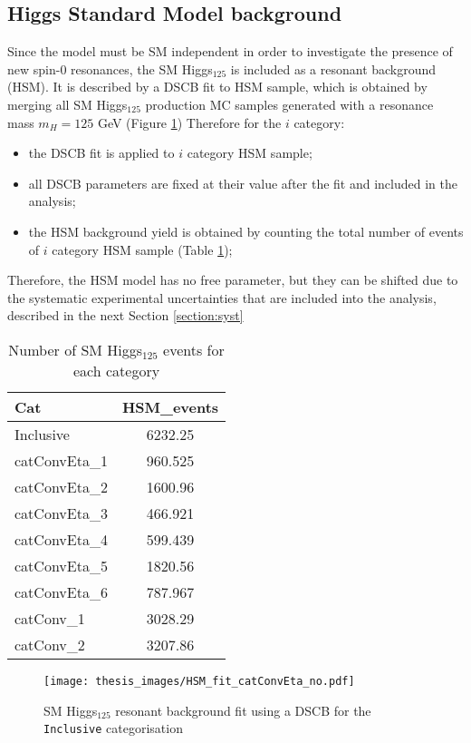 \documentclass[a4paper, oneside, 11pt, openright]{book}
\begin{document}
 			\subsection{Higgs Standard Model background}
 				Since the model must be SM independent in order to investigate the presence of new spin-0 resonances, the SM Higgs$_{125}$ is included as a resonant background (HSM). It is described by a DSCB fit to HSM sample, which is obtained by merging all SM Higgs$_{125}$ production MC samples generated with a resonance mass $m_H=125$ GeV (Figure \ref{fig:HSM_fit}) Therefore for the $i$ category:
 				\begin{itemize}
 					\item the DSCB fit is applied to $i$ category HSM sample;
 					\item all DSCB parameters are fixed at their value after the fit and included in the analysis;
 					\item the HSM background yield is obtained by counting the total number of events of $i$ category HSM sample (Table \ref{tab:HSM});
 				\end{itemize}  
 				Therefore, the HSM model has no free parameter, but they can be shifted due to the systematic experimental uncertainties that are included into the analysis, described in the next Section \ref{section:syst}
 				\begin{table}
 					\centering
						\begin{tabular}{lc}
							\toprule[1.5pt]
							Cat &  HSM\_events \\
							\midrule
							Inclusive & 6232.25 \\
							\midrule
							catConvEta\_1 & 960.525 \\
							catConvEta\_2 & 1600.96 \\
							catConvEta\_3 & 466.921 \\
							catConvEta\_4 & 599.439 \\
							catConvEta\_5 & 1820.56 \\
							catConvEta\_6 & 787.967\\
							\midrule
							catConv\_1 & 3028.29 \\
							catConv\_2 & 3207.86 \\
							\bottomrule[1.5pt]
						\end{tabular}
 					\caption{Number of SM Higgs$_{125}$ events for each category}
 					\label{tab:HSM}
 				\end{table}
 				\begin{figure}[]
 					\centering
 					\texttt{[image: thesis\_images/HSM\_fit\_catConvEta\_no.pdf]}
 					\caption{SM Higgs$_{125}$ resonant background fit using a DSCB for the \texttt{Inclusive} categorisation}
 					\label{fig:HSM_fit}
 				\end{figure}
 			
\end{document}
